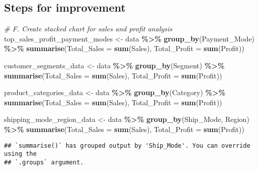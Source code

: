 \documentclass[
]{article}
\newenvironment{Shaded}{\begin{snugshade}}{\end{snugshade}}
\newcommand{\AttributeTok}[1]{\textcolor[rgb]{0.13,0.29,0.53}{#1}}
\newcommand{\CommentTok}[1]{\textcolor[rgb]{0.56,0.35,0.01}{\textit{#1}}}
\newcommand{\FunctionTok}[1]{\textcolor[rgb]{0.13,0.29,0.53}{\textbf{#1}}}
\newcommand{\NormalTok}[1]{#1}
\newcommand{\OtherTok}[1]{\textcolor[rgb]{0.56,0.35,0.01}{#1}}
\newcommand{\SpecialCharTok}[1]{\textcolor[rgb]{0.81,0.36,0.00}{\textbf{#1}}}
\begin{document}
\hypertarget{steps-for-improvement}{%
\subsection{Steps for improvement}\label{steps-for-improvement}}

\begin{Shaded}
\begin{Highlighting}[]
\CommentTok{\# F. Create stacked chart for sales and profit analysis}
\NormalTok{top\_sales\_profit\_payment\_modes }\OtherTok{\textless{}{-}}\NormalTok{ data }\SpecialCharTok{\%\textgreater{}\%}
  \FunctionTok{group\_by}\NormalTok{(Payment\_Mode) }\SpecialCharTok{\%\textgreater{}\%}
  \FunctionTok{summarise}\NormalTok{(}\AttributeTok{Total\_Sales =} \FunctionTok{sum}\NormalTok{(Sales), }\AttributeTok{Total\_Profit =} \FunctionTok{sum}\NormalTok{(Profit))}

\NormalTok{customer\_segments\_data }\OtherTok{\textless{}{-}}\NormalTok{ data }\SpecialCharTok{\%\textgreater{}\%}
  \FunctionTok{group\_by}\NormalTok{(Segment) }\SpecialCharTok{\%\textgreater{}\%}
  \FunctionTok{summarise}\NormalTok{(}\AttributeTok{Total\_Sales =} \FunctionTok{sum}\NormalTok{(Sales), }\AttributeTok{Total\_Profit =} \FunctionTok{sum}\NormalTok{(Profit))}

\NormalTok{product\_categories\_data }\OtherTok{\textless{}{-}}\NormalTok{ data }\SpecialCharTok{\%\textgreater{}\%}
  \FunctionTok{group\_by}\NormalTok{(Category) }\SpecialCharTok{\%\textgreater{}\%}
  \FunctionTok{summarise}\NormalTok{(}\AttributeTok{Total\_Sales =} \FunctionTok{sum}\NormalTok{(Sales), }\AttributeTok{Total\_Profit =} \FunctionTok{sum}\NormalTok{(Profit))}

\NormalTok{shipping\_mode\_region\_data }\OtherTok{\textless{}{-}}\NormalTok{ data }\SpecialCharTok{\%\textgreater{}\%}
  \FunctionTok{group\_by}\NormalTok{(Ship\_Mode, Region) }\SpecialCharTok{\%\textgreater{}\%}
  \FunctionTok{summarise}\NormalTok{(}\AttributeTok{Total\_Sales =} \FunctionTok{sum}\NormalTok{(Sales), }\AttributeTok{Total\_Profit =} \FunctionTok{sum}\NormalTok{(Profit))}
\end{Highlighting}
\end{Shaded}

\begin{verbatim}
## `summarise()` has grouped output by 'Ship_Mode'. You can override using the
## `.groups` argument.
\end{verbatim}
\end{document}
